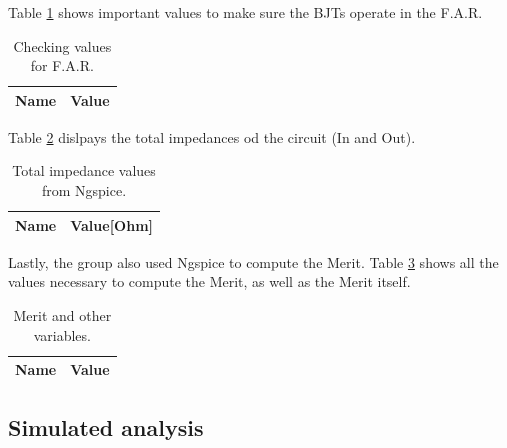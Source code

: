 Table \ref{tab:op_sim} shows important values to make sure the BJTs operate in the F.A.R.

\begin{table}[ht]
	\centering
	\begin{tabular}{|l|r|}
		\hline    
		{\bf Name} & {\bf Value} \\ \hline
    		
	\end{tabular}
	
	\caption{Checking values for F.A.R.}
    
\label{tab:op_sim}
\end{table}

Table \ref{tab:imp_sim} dislpays the total impedances od the circuit (In and Out).

\begin{table}[ht]
	\centering
	\begin{tabular}{|l|r|}
		\hline    
		{\bf Name} & {\bf Value[Ohm]} \\ \hline
    		
    		
	\end{tabular}
	
	\caption{Total impedance values from Ngspice.}
    
\label{tab:imp_sim}
\end{table}

Lastly, the group also used Ngspice to compute the Merit. Table \ref{tab:merit} shows all the 
values necessary to compute the Merit, as well as the Merit itself.

\begin{table}[ht]
	\centering
	\begin{tabular}{|l|r|}
		\hline    
		{\bf Name} & {\bf Value} \\ \hline
    		
	\end{tabular}
	
	\caption{Merit and other variables.}
    
\label{tab:merit}
\end{table}



\subsection{Simulated analysis}
\label{subsec:sim_an}

